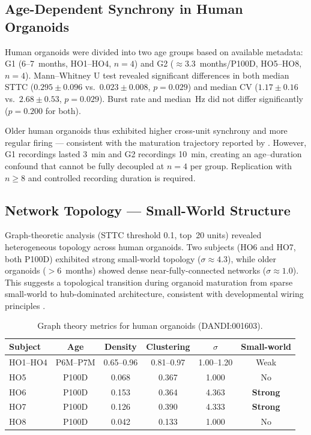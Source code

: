 \documentclass[11pt,a4paper]{article}
\begin{document}
\subsection{Age-Dependent Synchrony in Human Organoids}

Human organoids were divided into two age groups based on available metadata: 
G1 (6--7~months, HO1--HO4, $n=4$) and G2 ($\approx$3.3~months/P100D, HO5--HO8, 
$n=4$). Mann--Whitney U test revealed significant differences in both median STTC 
($0.295 \pm 0.096$ vs.\ $0.023 \pm 0.008$, $p = 0.029$) and median CV 
($1.17 \pm 0.16$ vs.\ $2.68 \pm 0.53$, $p = 0.029$). Burst rate and median~Hz 
did not differ significantly ($p = 0.200$ for both).

Older human organoids thus exhibited higher cross-unit synchrony and more regular 
firing --- consistent with the maturation trajectory reported by 
\citet{trujillo2019}. However, G1 recordings lasted 3~min and G2 recordings 10~min, 
creating an age--duration confound that cannot be fully decoupled at $n=4$ per 
group. Replication with $n \geq 8$ and controlled recording duration is required.

\subsection{Network Topology --- Small-World Structure}

Graph-theoretic analysis (STTC threshold 0.1, top~20 units) revealed heterogeneous 
topology across human organoids. Two subjects (HO6 and HO7, both P100D) exhibited 
strong small-world topology ($\sigma \approx 4.3$), while older organoids 
($>$6~months) showed dense near-fully-connected networks ($\sigma \approx 1.0$). 
This suggests a topological transition during organoid maturation from sparse 
small-world to hub-dominated architecture, consistent with developmental wiring 
principles \citep{watts1998}.

\begin{table}[h]
\centering
\caption{Graph theory metrics for human organoids (DANDI:001603).}
\label{tab:graph}
\small
\begin{tabular}{lccccc}
\toprule
\textbf{Subject} & \textbf{Age} & \textbf{Density} & 
\textbf{Clustering} & \boldmath$\sigma$ & \textbf{Small-world} \\
\midrule
HO1--HO4 & P6M--P7M & 0.65--0.96 & 0.81--0.97 & 1.00--1.20 & Weak \\
HO5 & P100D & 0.068 & 0.367 & 1.000 & No \\
HO6 & P100D & 0.153 & 0.364 & 4.363 & \textbf{Strong} \\
HO7 & P100D & 0.126 & 0.390 & 4.333 & \textbf{Strong} \\
HO8 & P100D & 0.042 & 0.133 & 1.000 & No \\
\bottomrule
\end{tabular}
\end{table}
\end{document}
